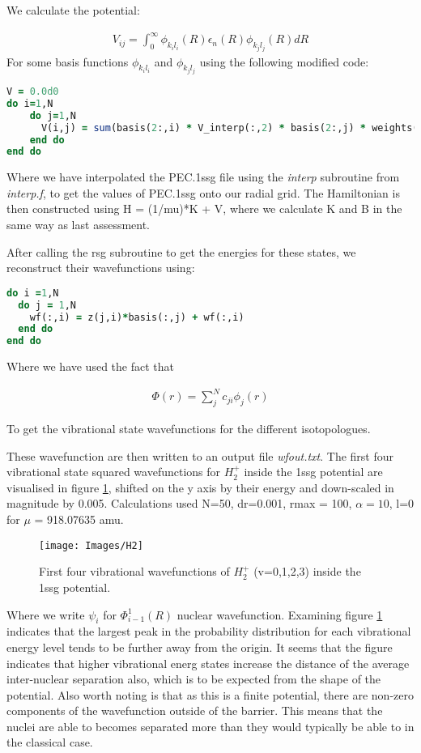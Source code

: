 \documentclass{article}
\begin{document}
	We calculate the potential:
	
	\begin{gather}
		V_{ij} = \int_{0}^{\infty} \phi_{k_il_i}(R) \epsilon_n(R) \phi_{k_jl_j}(R)dR
	\end{gather}
	For some basis functions $\phi_{k_il_i}$ and $\phi_{k_jl_j}$ using the following modified code: 
	
\begin{lstlisting}[language=fortran]
V = 0.0d0
do i=1,N
	do j=1,N
	  V(i,j) = sum(basis(2:,i) * V_interp(:,2) * basis(2:,j) * weights(2:))
	end do
end do
\end{lstlisting}

Where we have interpolated the PEC.1ssg file using the \textit{interp} subroutine from \textit{interp.f}, to get the values of PEC.1ssg onto our radial grid.
The Hamiltonian is then constructed using H = (1/mu)*K + V, where we calculate K and B in the same way as last assessment. 

After calling the rsg subroutine to get the energies for these states, we reconstruct their wavefunctions using:

\begin{lstlisting}[language=fortran]
do i =1,N
  do j = 1,N
    wf(:,i) = z(j,i)*basis(:,j) + wf(:,i)
  end do
end do
\end{lstlisting}

Where we have used the fact that 

\begin{gather}
	\Phi(r) = \sum_{j}^{N} c_{ji} \phi_j(r)
\end{gather}

To get the vibrational state wavefunctions for the different isotopologues.

These wavefunction are then written to an output file \textit{wfout.txt}. The first four vibrational state squared wavefunctions for $H_2^+$ inside the 1ssg potential are visualised in figure \ref{H2}, shifted on the y axis by their energy and down-scaled in magnitude by 0.005. Calculations used N=50, dr=0.001, rmax = 100, $\alpha=10$, l=0 for $\mu$ = 918.07635 amu.

\begin{figure}[H]
	\centering
	\texttt{[image: Images/H2]}\\
	\caption{First four vibrational wavefunctions of $H_2^+$ (v=0,1,2,3) inside the 1ssg potential.}
	\label{H2}
\end{figure}

Where we write $\psi_i$ for $\Phi_{i-1}^{1}(R)$ nuclear wavefunction. 
Examining figure \ref{H2} indicates that the largest peak in the probability distribution for each vibrational energy level tends to be further away from the origin.
It seems that the figure indicates that higher vibrational energ states increase the distance of the average inter-nuclear separation also, which is to be expected from the shape of the potential. 
Also worth noting is that as this is a finite potential, there are non-zero components of the wavefunction outside of the barrier. This means that the nuclei are able to becomes separated more than they would typically be able to in the classical case.
\end{document}
